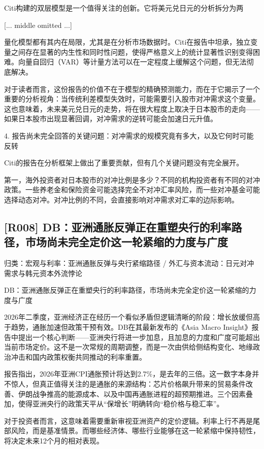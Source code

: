 \documentclass[11pt]{ctexart}
\begin{document}
Citi构建的双层模型是一个值得关注的创新。它将美元兑日元的分析拆分为两

[... middle omitted ...]

量化模型都有其内在局限，尤其是在分析市场数据时。Citi在报告中坦承，独立变量之间存在显著的内生性和同时性问题，使得严格意义上的统计显著性识别变得困难。向量自回归（VAR）等计量方法可以在一定程度上缓解这个问题，但无法彻底解决。

对于读者而言，这份报告的价值不在于模型的精确预测能力，而在于它揭示了一个重要的分析视角：当传统利差模型失效时，可能需要引入股市对冲需求这个变量。这也意味着，未来美元兑日元的走势，将在很大程度上取决于日本股市的走向——如果日本股市出现显著回调，对冲需求的逆转可能会加速日元升值。

4. 报告尚未完全回答的关键问题：对冲需求的规模究竟有多大，以及它何时可能反转

Citi的报告在分析框架上做出了重要贡献，但有几个关键问题没有完全展开。

第一，海外投资者对日本股市的对冲比例是多少？不同的机构投资者有不同的对冲政策。一些养老金和保险资金可能选择完全不对冲汇率风险，而一些对冲基金可能选择动态对冲。对冲比例的不同，会直接影响对冲需求对汇率的边际影响。

\subsection{[R008] DB：亚洲通胀反弹正在重塑央行的利率路径，市场尚未完全定价这一轮紧缩的力度与广度}
{\small\color{refgray}归类：宏观与利率：亚洲通胀反弹与央行紧缩路径 / 外汇与资本流动：日元对冲需求与韩元资本外流悖论}

DB：亚洲通胀反弹正在重塑央行的利率路径，市场尚未完全定价这一轮紧缩的力度与广度

2026年二季度，亚洲经济正在经历一个看似矛盾但逻辑清晰的阶段：增长放缓但高于趋势，通胀加速但政策干预有效。DB在其最新发布的《Asia Macro Insight》报告中提出一个核心判断——亚洲央行将进一步加息，且加息的力度和广度可能超出当前市场定价。这不是一次常规的周期调整，而是一次由供给侧结构变化、地缘政治冲击和国内政策权衡共同推动的利率重置。

报告指出，2026年亚洲CPI通胀预计将达到2.7\%，是去年的三倍。这一数字本身并不惊人，但真正值得关注的是通胀的来源结构：芯片价格飙升带来的贸易条件改善、伊朗战争推高的能源成本、以及中国再通胀进程的超预期推进。三个因素叠加，使得亚洲央行的政策天平从“保增长”明确转向“稳价格与稳汇率”。

对于投资者而言，这意味着需要重新审视亚洲资产的定价逻辑。利率上行不再是尾部风险，而是基准情景。而哪些经济体、哪些行业能够在这一轮紧缩中保持韧性，将决定未来12个月的相对表现。
\end{document}

